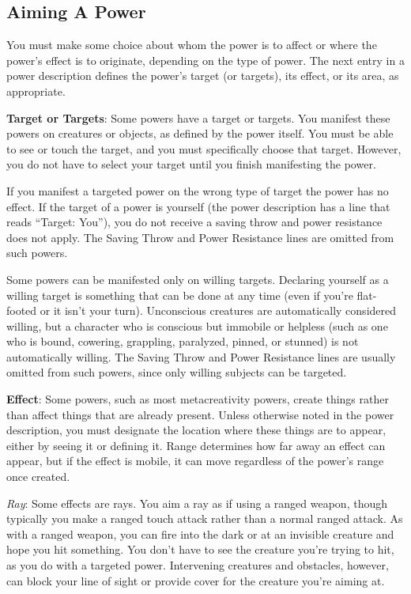 \subsection{Aiming A Power}
You must make some choice about whom the power is to affect or where the power's effect is to originate, depending on the type of power. The next entry in a power description defines the power's target (or targets), its effect, or its area, as appropriate.

\textbf{Target or Targets}: Some powers have a target or targets. You manifest these powers on creatures or objects, as defined by the power itself. You must be able to see or touch the target, and you must specifically choose that target. However, you do not have to select your target until you finish manifesting the power.

If you manifest a targeted power on the wrong type of target the power has no effect. If the target of a power is yourself (the power description has a line that reads ``Target: You''), you do not receive a saving throw and power resistance does not apply. The Saving Throw and Power Resistance lines are omitted from such powers.

Some powers can be manifested only on willing targets. Declaring yourself as a willing target is something that can be done at any time (even if you're flat-footed or it isn't your turn). Unconscious creatures are automatically considered willing, but a character who is conscious but immobile or helpless (such as one who is bound, cowering, grappling, paralyzed, pinned, or stunned) is not automatically willing. The Saving Throw and Power Resistance lines are usually omitted from such powers, since only willing subjects can be targeted.

\textbf{Effect}: Some powers, such as most metacreativity powers, create things rather than affect things that are already present. Unless otherwise noted in the power description, you must designate the location where these things are to appear, either by seeing it or defining it. Range determines how far away an effect can appear, but if the effect is mobile, it can move regardless of the power's range once created.

\textit{Ray}: Some effects are rays. You aim a ray as if using a ranged weapon, though typically you make a ranged touch attack rather than a normal ranged attack. As with a ranged weapon, you can fire into the dark or at an invisible creature and hope you hit something. You don't have to see the creature you're trying to hit, as you do with a targeted power. Intervening creatures and obstacles, however, can block your line of sight or provide cover for the creature you're aiming at.

